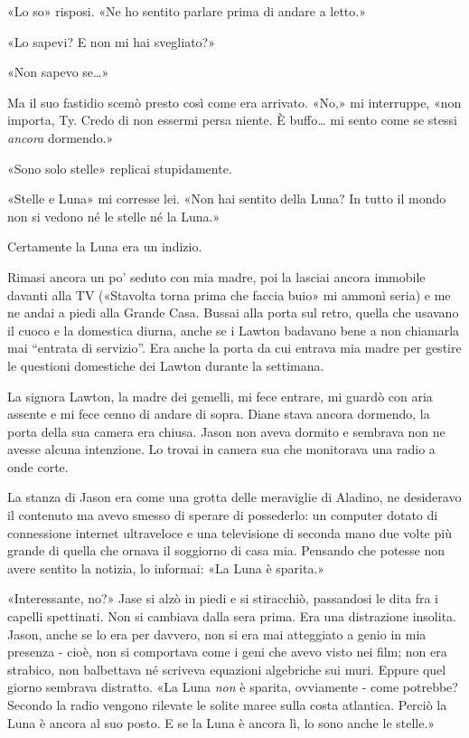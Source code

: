 «Lo so» risposi. «Ne ho sentito parlare prima di andare a letto.»

«Lo sapevi? E non mi hai svegliato?»

«Non sapevo se\ldots»

Ma il suo fastidio scemò presto così come era arrivato. «No,» mi
interruppe, «non importa, Ty. Credo di non essermi persa niente. È
buffo\ldots{} mi sento come se stessi \emph{ancora} dormendo.»

«Sono solo stelle» replicai stupidamente.

«Stelle e Luna» mi corresse lei. «Non hai sentito della Luna? In tutto
il mondo non si vedono né le stelle né la Luna.»

\separatorefiori

Certamente la Luna era un indizio.

Rimasi ancora un po' seduto con mia madre, poi la lasciai ancora
immobile davanti alla TV («Stavolta torna prima che faccia buio» mi
ammonì seria) e me ne andai a piedi alla Grande Casa. Bussai alla porta
sul retro, quella che usavano il cuoco e la domestica diurna, anche se i
Lawton badavano bene a non chiamarla mai ``entrata di servizio''. Era
anche la porta da cui entrava mia madre per gestire le questioni
domestiche dei Lawton durante la settimana.

La signora Lawton, la madre dei gemelli, mi fece entrare, mi guardò con
aria assente e mi fece cenno di andare di sopra. Diane stava ancora
dormendo, la porta della sua camera era chiusa. Jason non aveva dormito
e sembrava non ne avesse alcuna intenzione. Lo trovai in camera sua che
monitorava una radio a onde corte.

La stanza di Jason era come una grotta delle meraviglie di Aladino, ne
desideravo il contenuto ma avevo smesso di sperare di possederlo: un
computer dotato di connessione internet ultraveloce e una televisione di
seconda mano due volte più grande di quella che ornava il soggiorno di
casa mia. Pensando che potesse non avere sentito la notizia, lo
informai: «La Luna è sparita.»

«Interessante, no?» Jase si alzò in piedi e si stiracchiò, passandosi le
dita fra i capelli spettinati. Non si cambiava dalla sera prima. Era una
distrazione insolita. Jason, anche se lo era per davvero, non si era mai
atteggiato a genio in mia presenza - cioè, non si comportava come i geni
che avevo visto nei film; non era strabico, non balbettava né scriveva
equazioni algebriche sui muri. Eppure quel giorno sembrava distratto.
«La Luna \emph{non} è sparita, ovviamente - come potrebbe? Secondo la
radio vengono rilevate le solite maree sulla costa atlantica. Perciò la
Luna è ancora al suo posto. E se la Luna è ancora lì, lo sono anche le
stelle.»

